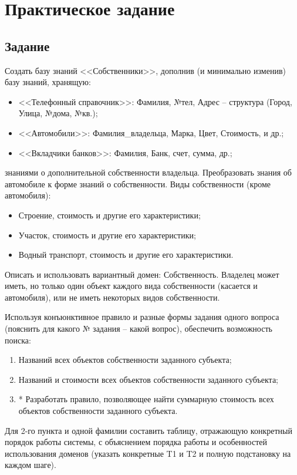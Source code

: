 \documentclass[14pt,a4paper]{scrreprt}
\begin{document}


\thispagestyle{empty}

\chapter{Практическое задание}

\section{Задание}

Создать базу знаний <<Собственники>>, дополнив (и минимально изменив) базу знаний, хранящую:
\begin{itemize}
	\item <<Телефонный справочник>>: Фамилия, №тел, Адрес -- структура (Город, Улица, №дома, №кв.);
	\item <<Автомобили>>: Фамилия\_владельца, Марка, Цвет, Стоимость, и др.;
	\item <<Вкладчики банков>>: Фамилия, Банк, счет, сумма, др.;
\end{itemize}
знаниями о дополнительной собственности владельца. Преобразовать знания об автомобиле к форме знаний о собственности. Виды собственности (кроме автомобиля):
\begin{itemize}
	\item Строение, стоимость и другие его характеристики;
	\item Участок, стоимость и другие его характеристики;
	\item Водный транспорт, стоимость и другие его характеристики.
\end{itemize}
Описать и использовать вариантный домен: Собственность. Владелец может иметь, но только один объект каждого вида собственности (касается и автомобиля), или не иметь некоторых видов собственности.

Используя конъюнктивное правило и разные формы задания одного вопроса (пояснить для какого № задания -- какой вопрос), обеспечить возможность поиска:
\begin{enumerate}
	\item Названий всех объектов собственности заданного субъекта;
	\item Названий и стоимости всех объектов собственности заданного субъекта;
	\item * Разработать правило, позволяющее найти суммарную стоимость всех объектов собственности заданного субъекта.
\end{enumerate}
Для 2-го пункта и одной фамилии составить таблицу, отражающую конкретный порядок работы системы, с объяснением порядка работы и особенностей использования доменов (указать конкретные T1 и T2 и полную подстановку на каждом шаге).
\end{document}
